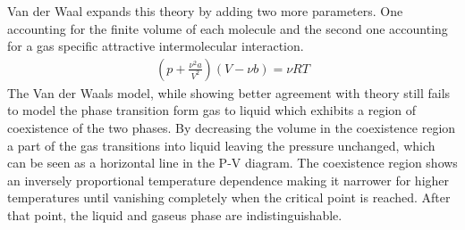 \documentclass[a4paper,10pt,twocolumn]{article}
\begin{document}
    Van der Waal expands this theory by adding two more parameters.
    One accounting for the finite volume of each molecule and the second one accounting for a gas specific attractive intermolecular interaction.
    \begin{align}
    (p+\frac{\nu^2 a}{V^2})(V-\nu b) = \nu RT
    \end{align}
    The Van der Waals model, while showing better agreement with theory still fails to model the phase transition form gas to liquid which exhibits a region of coexistence of the two phases. 
    By decreasing the volume in the coexistence region a part of the gas transitions into liquid leaving the pressure unchanged, which can be seen as a horizontal line in the P-V diagram.
    The coexistence region shows an inversely proportional temperature dependence making it narrower for higher temperatures until vanishing completely when the critical point is reached.
    After that point, the liquid and gaseus phase are indistinguishable.
\end{document}
